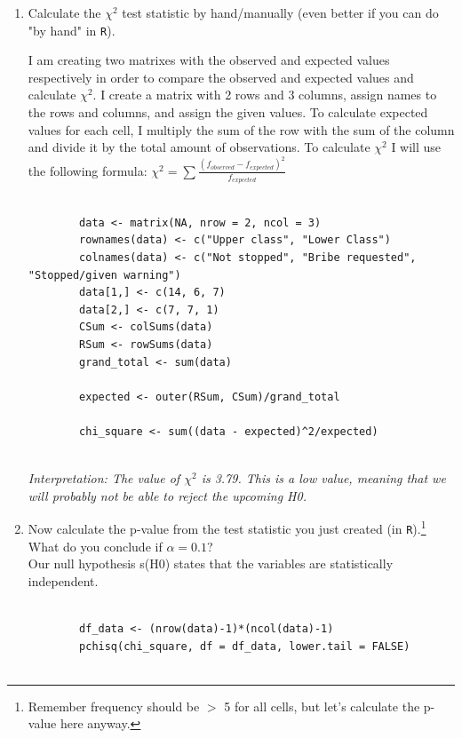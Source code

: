 \documentclass[12pt,letterpaper]{article}
\begin{document}
\begin{enumerate}
	
	\item [(a)]
	Calculate the $\chi^2$ test statistic by hand/manually (even better if you can do "by hand" in \texttt{R}).\\
	\vspace{1 cm}
	
	I am creating two matrixes with the observed and expected values respectively in order to compare the observed and expected values and calculate $\chi^2$. I create a matrix with 2 rows and 3 columns, assign names to the rows and columns, and assign the given values. To calculate expected values for each cell, I multiply the sum of the row with the sum of the column and divide it by the total amount of observations. To calculate $\chi^2$ I will use the following formula: $\chi^2 = \sum{\frac{(f_{observed}-f_{expected})^2}{f_{expected}}}$
	\begin{verbatim}
		
		data <- matrix(NA, nrow = 2, ncol = 3)
		rownames(data) <- c("Upper class", "Lower Class")
		colnames(data) <- c("Not stopped", "Bribe requested", "Stopped/given warning")
		data[1,] <- c(14, 6, 7)
		data[2,] <- c(7, 7, 1)
		CSum <- colSums(data) 
		RSum <- rowSums(data)
		grand_total <- sum(data)
		
		expected <- outer(RSum, CSum)/grand_total
		
		chi_square <- sum((data - expected)^2/expected)
		
	\end{verbatim}
	
\textit{	Interpretation: The value of $\chi^2$ is 3.79. This is a low value, meaning that we will probably not be able to reject the upcoming H0.}
	
	
	\item [(b)]
	Now calculate the p-value from the test statistic you just created (in \texttt{R}).\footnote{Remember frequency should be $>$ 5 for all cells, but let's calculate the p-value here anyway.}  What do you conclude if $\alpha = 0.1$?\\
	
	Our null hypothesis s(H0) states that the variables are statistically independent. 
	
		\begin{verbatim}
		
		df_data <- (nrow(data)-1)*(ncol(data)-1)
		pchisq(chi_square, df = df_data, lower.tail = FALSE)
		
	\end{verbatim}
		

\end{enumerate}
\end{document}
